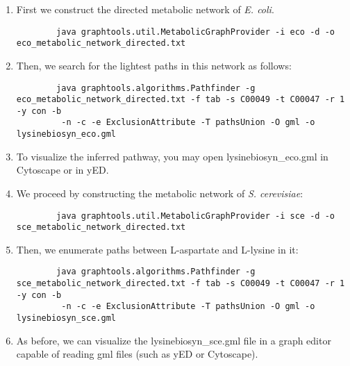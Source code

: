 \begin{enumerate}

\item First we construct the directed metabolic network of \textit{E. coli}.

        {\color{Blue} \begin{footnotesize}
		\begin{verbatim}
		java graphtools.util.MetabolicGraphProvider -i eco -d -o eco_metabolic_network_directed.txt
		\end{verbatim} \end{footnotesize}
		}

\item Then, we search for the lightest paths in this network as follows:

		{\color{Blue} \begin{footnotesize}
		\begin{verbatim}
		java graphtools.algorithms.Pathfinder -g eco_metabolic_network_directed.txt -f tab -s C00049 -t C00047 -r 1 -y con -b
		 -n -c -e ExclusionAttribute -T pathsUnion -O gml -o lysinebiosyn_eco.gml
		\end{verbatim} \end{footnotesize}
		}

\item To visualize the inferred pathway, you may open lysinebiosyn\_eco.gml in Cytoscape or in yED.


\item We proceed by constructing the metabolic network of \textit{S. cerevisiae}:

	 {\color{Blue} \begin{footnotesize}
		\begin{verbatim}
		java graphtools.util.MetabolicGraphProvider -i sce -d -o sce_metabolic_network_directed.txt
		\end{verbatim} \end{footnotesize}
		}

\item Then, we enumerate paths between L-aspartate and L-lysine in it:

		{\color{Blue} \begin{footnotesize}
		\begin{verbatim}
		java graphtools.algorithms.Pathfinder -g sce_metabolic_network_directed.txt -f tab -s C00049 -t C00047 -r 1 -y con -b
		 -n -c -e ExclusionAttribute -T pathsUnion -O gml -o lysinebiosyn_sce.gml
		\end{verbatim} \end{footnotesize}
		}

\item As before, we can visualize the lysinebiosyn\_sce.gml file in a graph editor capable of reading gml files
     (such as yED or Cytoscape).

\end{enumerate}


